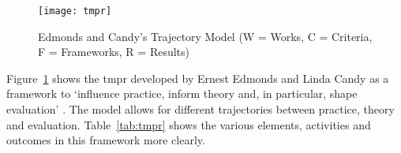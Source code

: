 


\begin{figure}[htb] %
  \centering
  \texttt{[image: tmpr]}
  \caption[Trajectory Model]{Edmonds and Candy's Trajectory Model (W = Works, C = Criteria, F = Frameworks, R = Results)}
\label{fig:tmpr}
\end{figure}

Figure~\ref{fig:tmpr} shows the \gls{tmpr} developed by Ernest Edmonds and Linda Candy as a framework to `influence practice, inform theory and, in particular, shape evaluation' \autocite{Edmonds2010}. The model allows for different trajectories between practice, theory and evaluation. Table~\ref{tab:tmpr} shows the various elements, activities and outcomes in this framework more clearly.

